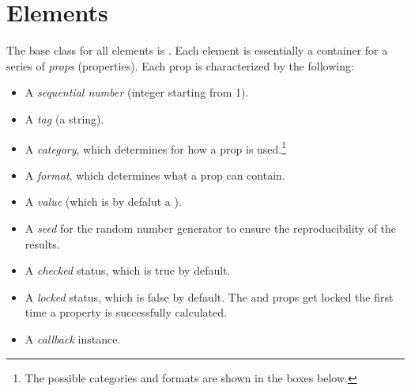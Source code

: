\documentclass{tufte-handout}
\begin{document}
\section{Elements}

The base class for all elements is . 
Each element is essentially a container for a series of \emph{props} (properties). Each prop is characterized by the following:
\begin{itemize}
	\item A \emph{sequential number} (integer starting from 1).
	\item A \emph{tag} (a string).
	\item A \emph{category}, which determines for how a prop is used.\footnote{The possible categories and formats are shown in the boxes below.}
	\item A \emph{format}, which determines what a prop can contain.
	\item A \emph{value} (which is by defalut a ).
	\item A \emph{seed} for the random number generator to ensure the reproducibility of the results.
	\item A \emph{checked} status, which is true by default.
	\item A \emph{locked} status, which is false by default. The  and  props get locked the first time a  property is successfully calculated.
	\item A \emph{callback} instance.
\end{itemize}
\end{document}
